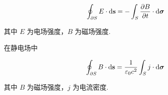 \begin{example}[ Faraday 定律]
$$
\oint_{\partial S} E\cdot\mathrm{d}\mathbf{s}=-\int_S\frac{\partial{B}}{\partial{t}}\cdot\mathrm{d}\bm{\sigma}
$$

    其中 $E$ 为电场强度，$B$ 为磁场强度.
\end{example}

\begin{example}[ Ampère 定律]
    在静电场中

$$
\oint_{\partial S}B\cdot\mathrm{d}\mathbf{s}=\frac{1}{\varepsilon_0c^2}\int_S j\cdot\mathrm{d}\bm{\sigma}
$$

    其中 $B$ 为磁场强度，$j$ 为电流密度.
\end{example}

